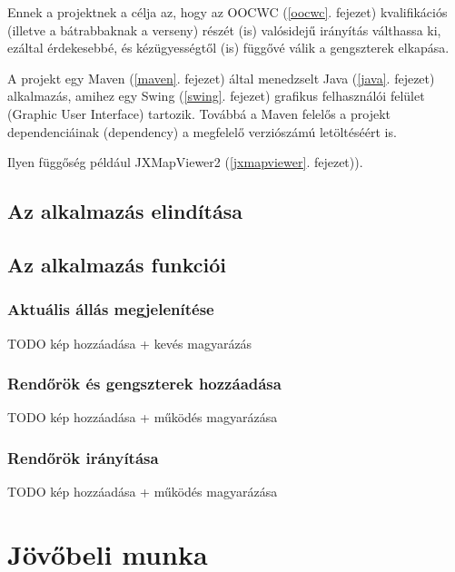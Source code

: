 \documentclass[a4paper,12pt]{report}
\begin{document}
Ennek a projektnek a célja az, hogy az OOCWC (\ref{oocwc}. fejezet) kvalifikációs (illetve a bátrabbaknak a verseny) részét (is) valósidejű irányítás válthassa ki, ezáltal érdekesebbé, és kézügyességtől (is) függővé válik a gengszterek elkapása.

\vspace{2mm}
A projekt egy Maven (\ref{maven}. fejezet) által menedzselt Java (\ref{java}. fejezet) alkalmazás, amihez egy Swing (\ref{swing}. fejezet) grafikus felhasználói felület (Graphic User Interface) tartozik. Továbbá a Maven felelős a projekt dependenciáinak (dependency) a megfelelő verziószámú letöltéséért is. 

\vspace{2mm}
Ilyen függőség például JXMapViewer2 \cite{jxmapv} (\ref{jxmapviewer}. fejezet)).


\section{Az alkalmazás elindítása}
\label{howtorun}



\section{Az alkalmazás funkciói}
\label{functions}


\subsection{Aktuális állás megjelenítése}
\label{actualstate}

TODO kép hozzáadása + kevés magyarázás

\subsection{Rendőrök és gengszterek hozzáadása}
\label{addcops}

TODO kép hozzáadása + működés magyarázása

\subsection{Rendőrök irányítása}
\label{controlcops}

TODO kép hozzáadása + működés magyarázása



\newpage
\chapter{Jövőbeli munka}
\label{futureworks}
\end{document}
